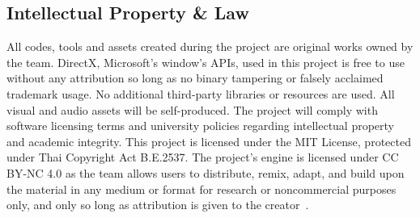 \subsection{Intellectual Property \& Law}
\label{subsec:intellectual-property-and-law}

All codes, tools and assets created during the project are original works owned by the team.
DirectX, Microsoft's window’s APIs, used in this project is free to use without any attribution so long as no binary tampering or falsely acclaimed trademark usage.
No additional third-party libraries or resources are used.
All visual and audio assets will be self-produced.
The project will comply with software licensing terms and university policies regarding intellectual property and academic integrity.
This project is licensed under the MIT License, protected under Thai Copyright Act B.E.2537.
The project's engine is licensed under CC BY-NC 4.0 as the team allows users to distribute, remix, adapt, and build upon the material in any medium or format for research or noncommercial purposes only,
and only so long as attribution is given to the creator~\cite{CreativeCommonsLicense}.

\label{tag:end}